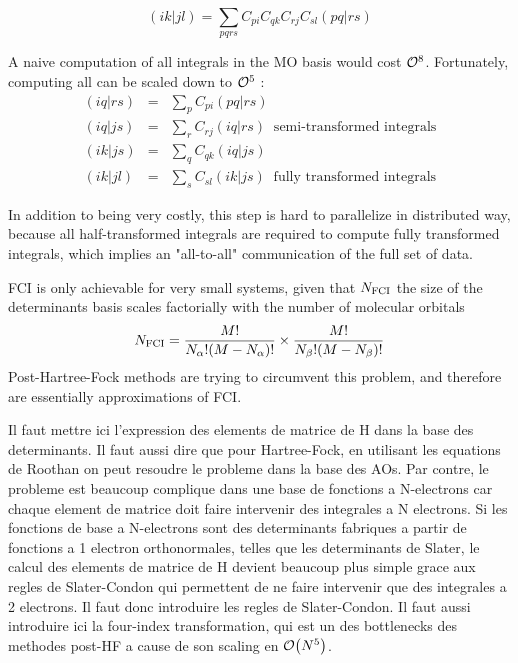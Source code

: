 \documentclass[./thesis.tex]{subfiles}
\begin{document}
\begin{equation}
(ik|jl) = \sum_{pqrs} C_{pi} C_{qk} C_{rj} C_{sl} (pq|rs)
\end{equation}

A naive computation of all integrals in the MO basis would cost ${\cal O}^8$. Fortunately, computing all can be scaled down to ${\cal O}^5$ \cite{Wilson_1987} :
\begin{eqnarray}
(iq\vert rs) & = & \sum_{p} C_{pi} (pq|rs) \nonumber \\ 
(iq\vert js) & = & \sum_{r} C_{rj} (iq|rs) \;\; \text{semi-transformed integrals} \\
(ik\vert js) & = & \sum_{q} C_{qk} (iq|js) \nonumber \\ 
(ik\vert jl) & = & \sum_{s} C_{sl} (ik|js)  \;\; \text{fully transformed integrals}
\end{eqnarray}

In addition to being very costly, this step is hard to parallelize in distributed way, because all half-transformed integrals are required to compute fully transformed integrals, which implies an "all-to-all" communication of the full set of data.

FCI is only achievable for very small systems, given that $N_\text{FCI}$ the size of the determinants basis scales factorially with the number of molecular orbitals
\begin{equation}
N_\text{FCI} = \frac{M!}{N_\alpha ! (M-N_\alpha)!} \times \frac{M!}{N_\beta ! (M-N_\beta)!}
\end{equation}
Post-Hartree-Fock methods are trying to circumvent this problem, and therefore are essentially approximations of FCI.




\alert{ Il faut mettre ici l'expression des elements de matrice de H dans la
base des determinants.  Il faut aussi dire que pour Hartree-Fock, en utilisant
les equations de Roothan on peut resoudre le probleme dans la base des AOs.
Par contre, le probleme est beaucoup complique dans une base de fonctions a
N-electrons car chaque element de matrice doit faire intervenir des integrales
a N electrons.  Si les fonctions de base a N-electrons sont des determinants
fabriques a partir de fonctions a 1 electron orthonormales, telles que les
determinants de Slater, le calcul des elements de matrice de H devient beaucoup
plus simple grace aux regles de Slater-Condon qui permettent de ne faire
intervenir que des integrales a 2 electrons. Il faut donc introduire les regles
de Slater-Condon.  Il faut aussi introduire ici la four-index transformation,
qui est un des bottlenecks des methodes post-HF a cause de son scaling en
$\order{N^5}$.  } 
\end{document}

